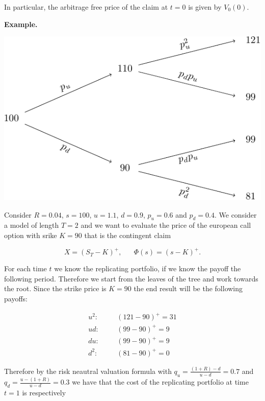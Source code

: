 \documentclass[
]{article}
\begin{document}
In particular, the arbitrage free price of the claim at \(t=0\) is given
by \(V_0(0)\).

\textbf{Example.}

\includegraphics{FinKont_homework_files/figure-latex/unnamed-chunk-4-1.pdf}

Consider \(R=0.04\), \(s=100\), \(u=1.1\), \(d=0.9\), \(p_u=0.6\) and
\(p_d=0.4\). We consider a model of length \(T=2\) and we want to
evaluate the price of the european call option with srike \(K=90\) that
is the contingent claim

\[
X=(S_T-K)^+,\hspace{20pt}\Phi(s)=(s-K)^+.
\]

For each time \(t\) we know the replicating portfolio, if we know the
payoff the following period. Therefore we start from the leaves of the
tree and work towards the root. Since the strike price is \(K=90\) the
end result will be the following payoffs:

\begin{align*}
u^2:\hspace{20pt}&(121-90)^+=31\\
ud:\hspace{20pt}&(99-90)^+=9\\
du:\hspace{20pt}&(99-90)^+=9\\
d^2:\hspace{20pt}&(81-90)^+=0
\end{align*}

Therefore by the risk neautral valuation formula with
\(q_u=\frac{(1+R)-d}{u-d}=0.7\) and \(q_d=\frac{u-(1+R)}{u-d}=0.3\) we
have that the cost of the replicating portfolio at time \(t=1\) is
respectively
\end{document}

